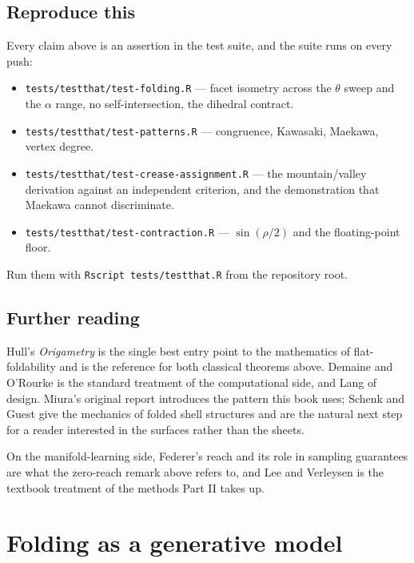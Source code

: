 \documentclass[
  british,
  a4paper,
]{book}
\providecommand{\tightlist}{%
  \setlength{\itemsep}{0pt}\setlength{\parskip}{0pt}}
\begin{document}
\section{Reproduce this}\label{geom-reproduce}

Every claim above is an assertion in the test suite, and the suite runs on every
push:

\begin{itemize}
\tightlist
\item
  \texttt{tests/testthat/test-folding.R} --- facet isometry across the \(\theta\) sweep and
  the \(\alpha\) range, no self-intersection, the dihedral contract.
\item
  \texttt{tests/testthat/test-patterns.R} --- congruence, Kawasaki, Maekawa, vertex
  degree.
\item
  \texttt{tests/testthat/test-crease-assignment.R} --- the mountain/valley derivation
  against an independent criterion, and the demonstration that Maekawa cannot
  discriminate.
\item
  \texttt{tests/testthat/test-contraction.R} --- \(\sin(\rho/2)\) and the floating-point
  floor.
\end{itemize}

Run them with \texttt{Rscript\ tests/testthat.R} from the repository root.

\section{Further reading}\label{geom-reading}

Hull's \emph{Origametry} \citep{hull2020origametry} is the single best entry point to the
mathematics of flat-foldability and is the reference for both classical theorems
above. Demaine and O'Rourke \citep{demaine2007folding} is the standard treatment of
the computational side, and Lang \citep{lang2011origami} of design. Miura's original
report \citep{miura1985method} introduces the pattern this book uses; Schenk and Guest
\citep{schenk2013geometry} give the mechanics of folded shell structures and are the
natural next step for a reader interested in the surfaces rather than the
sheets.

On the manifold-learning side, Federer's reach \citep{federer1959curvature} and its
role in sampling guarantees \citep{niyogi2008homology} are what the zero-reach remark
above refers to, and Lee and Verleysen \citep{lee2007nonlinear} is the textbook
treatment of the methods Part II takes up.

\chapter{Folding as a generative model}\label{generative}
\end{document}

